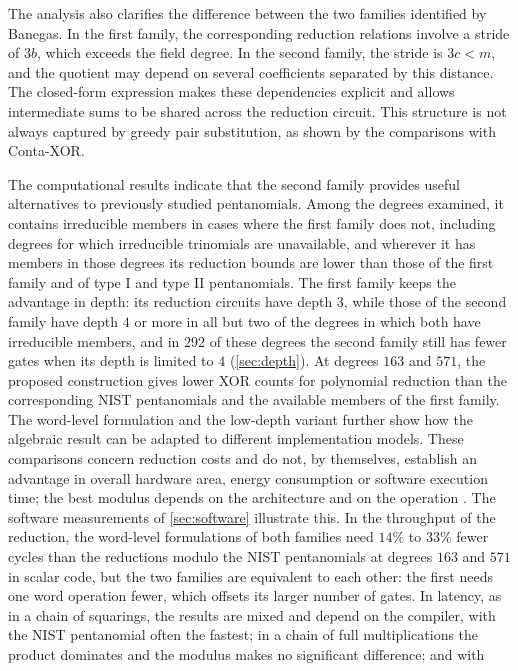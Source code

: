 \documentclass{ieeeaccess}
\theoremstyle{plain}
\theoremstyle{definition}
\begin{document}
The analysis also clarifies the difference between the two families identified
by Banegas. In the first family, the corresponding reduction relations involve a
stride of $3b$, which exceeds the field degree. In the second family, the stride
is $3c<m$, and the quotient may depend on several coefficients separated by this
distance. The closed-form expression makes these dependencies explicit and
allows intermediate sums to be shared across the reduction circuit. This
structure is not always captured by greedy pair substitution, as shown by the
comparisons with Conta-XOR.

The computational results indicate that the second family provides useful
alternatives to previously studied pentanomials. Among the degrees examined, it
contains irreducible members in cases where the first family does not, including
degrees for which irreducible trinomials are unavailable, and wherever it has
members in those degrees its reduction bounds are lower than those of the first
family and of type I and type II pentanomials. The first family keeps the
advantage in depth: its reduction circuits have depth $3$, while those of the
second family have depth $4$ or more in all but two of the degrees in which
both have irreducible members, and in $292$ of these degrees the second family
still has fewer gates when its depth is limited to $4$ (\cref{sec:depth}). At
degrees $163$ and
$571$, the proposed construction gives lower XOR counts for polynomial reduction
than the corresponding NIST pentanomials and the available members of the first
family. The word-level formulation and the low-depth variant further show how
the algebraic result can be adapted to different implementation models. These
comparisons concern reduction costs and do not, by themselves, establish an
advantage in overall hardware area, energy consumption or software execution
time; the best modulus depends on the architecture and on the operation
\cite{Scott2007}. The software measurements of \cref{sec:software} illustrate
this. In the throughput of the reduction, the word-level formulations of both
families need $14\%$ to $33\%$ fewer cycles than the reductions modulo the
NIST pentanomials at degrees $163$ and $571$ in scalar code, but the two
families are equivalent to each other: the first needs one word operation
fewer, which offsets its larger number of gates. In latency, as in a chain of
squarings, the results are mixed and depend on the compiler, with the NIST
pentanomial often the fastest; in a chain of full multiplications the product
dominates and the modulus makes no significant difference; and with
\end{document}
